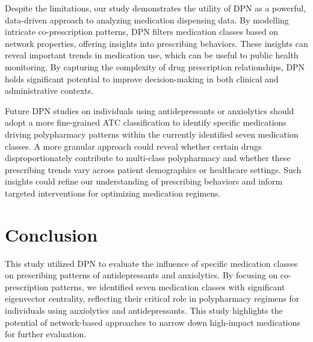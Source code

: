 \documentclass[
  authoryear,
  review]{elsarticle}
\begin{document}
Despite the limitations, our study demonstrates the utility of DPN as a
powerful, data-driven approach to analyzing medication dispensing data.
By modelling intricate co-prescription patterns, DPN filters medication
classes based on network properties, offering insights into prescribing
behaviors. These insights can reveal important trends in medication use,
which can be useful to public health monitoring. By capturing the
complexity of drug prescription relationships, DPN holds significant
potential to improve decision-making in both clinical and administrative
contexts.

Future DPN studies on individuals using antidepressants or anxiolytics
should adopt a more fine-grained ATC classification to identify specific
medications driving polypharmacy patterns within the currently
identified seven medication classes. A more granular approach could
reveal whether certain drugs disproportionately contribute to
multi-class polypharmacy and whether these prescribing trends vary
across patient demographics or healthcare settings. Such insights could
refine our understanding of prescribing behaviors and inform targeted
interventions for optimizing medication regimens.

\section{Conclusion}\label{conclusion}

This study utilized DPN to evaluate the influence of specific medication
classes on prescribing patterns of antidepressants and anxiolytics. By
focusing on co-prescription patterns, we identified seven medication
classes with significant eigenvector centrality, reflecting their
critical role in polypharmacy regimens for individuals using anxiolytics
and antidepressants. This study highlights the potential of
network-based approaches to narrow down high-impact medications for
further evaluation.


\renewcommand\refname{References}
  
\end{document}
